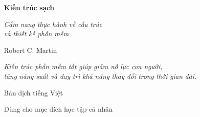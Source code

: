 \documentclass[10pt,twoside,openright]{book}
\begin{document}
\frontmatter
\pagestyle{main}

\begin{titlepage}
\thispagestyle{empty}
\centering
\vspace*{58pt}
{\fontsize{34}{40}\selectfont\bfseries Kiến trúc sạch\par}
\vspace{16pt}
{\fontsize{17}{22}\selectfont\itshape Cẩm nang thực hành về cấu trúc\\
và thiết kế phần mềm\par}
\vspace{54pt}
{\fontsize{12}{15}\selectfont Robert C. Martin\par}
\vfill
{\fontsize{9.5}{13}\selectfont\itshape
Kiến trúc phần mềm tốt giúp giảm nỗ lực con người,\\
tăng năng suất và duy trì khả năng thay đổi trong thời gian dài.\par}
\vspace{40pt}
{\fontsize{10}{13}\selectfont Bản dịch tiếng Việt\par}
\vspace{6pt}
{\fontsize{9}{11}\selectfont Dùng cho mục đích học tập cá nhân\par}
\vspace{14pt}
\end{titlepage}
\end{document}
